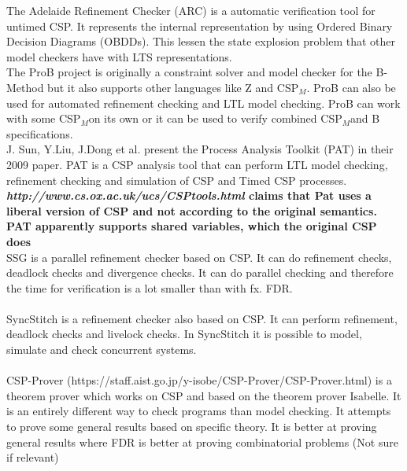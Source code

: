\documentclass[a4paper]{report}
\newcommand{\cspm}{CSP$_M$}
\begin{document}
The Adelaide Refinement Checker (ARC)\cite{Parashkevov1996} is a automatic verification tool for untimed CSP. It represents the internal representation by using Ordered Binary Decision Diagrams (OBDDs). This lessen the state explosion problem that other model checkers have with LTS representations.   \\ 

The ProB project\cite{ProB} is originally a constraint solver and model checker for the B-Method but it also supports other languages like Z and \cspm. ProB can also be used for automated refinement checking and LTL model checking. ProB can work with some \cspm on its own or it can be used to verify combined \cspm and B specifications. \\

J. Sun, Y.Liu, J.Dong et al. present the Process Analysis Toolkit (PAT) in their 2009 paper\cite{Sun2009}. PAT is a CSP analysis tool that can perform LTL model checking, refinement checking and simulation of CSP and Timed CSP processes. \textbf{\textit{http://www.cs.ox.ac.uk/ucs/CSPtools.html} claims that Pat uses a liberal version of CSP and not according to the original semantics. PAT apparently supports shared variables, which the original CSP does }\\

SSG is a parallel refinement checker based on CSP. It can do refinement checks, deadlock checks and divergence checks. It can do parallel checking and therefore the time for verification is a lot smaller than with fx. FDR. \\\\

SyncStitch is a refinement checker also based on CSP. It can perform refinement, deadlock checks and livelock checks. In SyncStitch it is possible to model, simulate and check concurrent systems.  \\\\

CSP-Prover\cite{Isobe2005} (https://staff.aist.go.jp/y-isobe/CSP-Prover/CSP-Prover.html) is a theorem prover which works on CSP and based on the theorem prover Isabelle. It is an entirely different way to check programs than model checking. It attempts to prove some general results based on specific theory. It is better at proving general results where FDR is better at proving combinatorial problems (Not sure if relevant)
\end{document}
